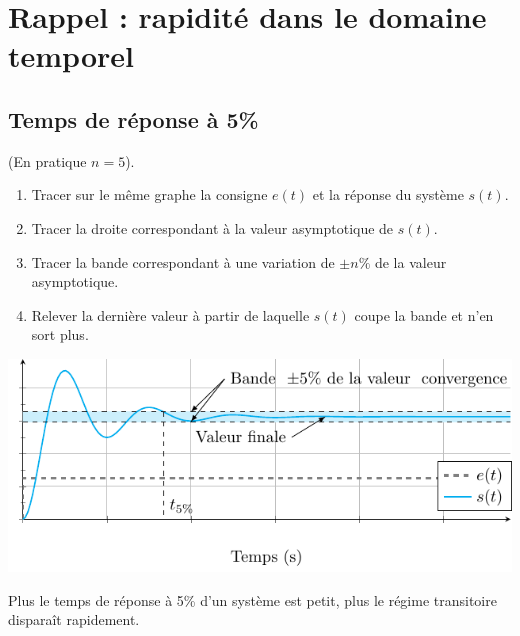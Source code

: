 \documentclass[10pt,fleqn]{article} %
\begin{document}

\setlength{\columnseprule}{.1pt}

\vspace{2cm}
\pagestyle{fancy}
\thispagestyle{plain}

\section{Rappel : rapidité dans le domaine temporel}

\subsection{Temps de réponse à 5\%}

\begin{methode}
 (En pratique $n=5$).\\

\begin{enumerate}
 \item Tracer sur le même graphe la consigne $e(t)$ et la réponse du système
$s(t)$.
\item Tracer la droite correspondant à la valeur asymptotique de $s(t)$.
\item Tracer la bande correspondant à une variation de $\pm n\%$ de la valeur
asymptotique.
\item Relever la dernière valeur à partir de laquelle $s(t)$ coupe la bande et
n'en sort plus.
\end{enumerate}
\end{methode}

\begin{center}
%
\includegraphics{images/perf}
\end{center}

\begin{resultat}
Plus le temps de réponse à 5\% d'un système est petit, plus le régime transitoire disparaît rapidement. 
\end{resultat}
\end{document}
